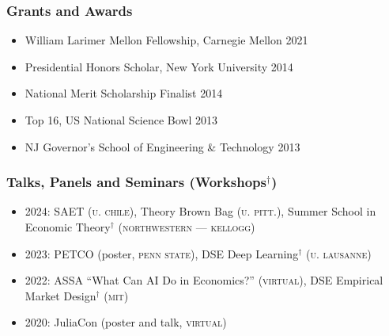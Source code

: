 \documentclass[12pt]{article}   %
\begin{document}

\subsubsection*{Grants and Awards}
\begin{itemize}
  \item William Larimer Mellon Fellowship, Carnegie Mellon \hfill 2021 
  \item Presidential Honors Scholar, New York University \hfill 2014
  \item National Merit Scholarship Finalist \hfill 2014
  \item Top 16, US National Science Bowl \hfill 2013
  \item NJ Governor's School of Engineering \& Technology \hfill 2013
\end{itemize}

\subsubsection*{Talks, Panels and Seminars (Workshops$^{\dagger}$)}
\begin{itemize}
  \item 2024: SAET (\textsc{u. chile}), Theory Brown Bag (\textsc{u. pitt.}), Summer School in Economic Theory$^{\dagger}$ (\textsc{northwestern --- kellogg})
  \item 2023: PETCO (poster, \textsc{penn state}), DSE Deep Learning$^{\dagger}$ (\textsc{u. lausanne})
  \item 2022: ASSA ``What Can AI Do in Economics?'' (\textsc{virtual}), DSE Empirical Market Design$^{\dagger}$ (\textsc{mit})
  \item 2020: JuliaCon (poster and talk, \textsc{virtual})
\end{itemize}
\end{document}
